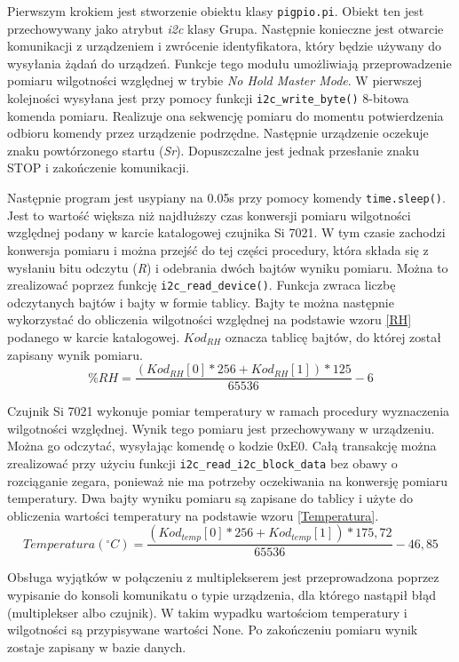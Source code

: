 \documentclass[a4paper,12pt,twoside]{article}
\begin{document}
Pierwszym krokiem jest stworzenie obiektu klasy \texttt{pigpio.pi}. Obiekt ten jest przechowywany jako atrybut \textit{i2c} klasy Grupa. Następnie konieczne jest otwarcie komunikacji z urządzeniem i zwrócenie identyfikatora, który będzie używany do wysyłania żądań do urządzeń. Funkcje tego modułu umożliwiają przeprowadzenie pomiaru wilgotności względnej w trybie \textit{No Hold Master Mode}. W pierwszej kolejności wysyłana jest przy pomocy funkcji \texttt{i2c{\_}write{\_}byte()} 8-bitowa komenda pomiaru. Realizuje ona sekwencję pomiaru do momentu potwierdzenia odbioru komendy przez urządzenie podrzędne. Następnie urządzenie oczekuje znaku powtórzonego startu (\textit{Sr}). Dopuszczalne jest jednak przesłanie znaku STOP i zakończenie komunikacji.

Następnie program jest usypiany na 0.05s przy pomocy komendy \texttt{time.sleep()}. Jest to wartość większa niż najdłuższy czas konwersji pomiaru wilgotności względnej podany w karcie katalogowej czujnika Si 7021. W tym czasie zachodzi konwersja pomiaru i można przejść do tej części procedury, która składa się z wysłaniu bitu odczytu (\textit{R}) i odebrania dwóch bajtów wyniku pomiaru. Można to zrealizować poprzez funkcję \texttt{i2c{\_}read{\_}device()}\cite{i2c_read_device}. Funkcja zwraca liczbę odczytanych bajtów i bajty w formie tablicy. Bajty te można następnie wykorzystać do obliczenia wilgotności względnej na podstawie wzoru \ref{RH} podanego w karcie katalogowej. ${Kod_{RH}}$ oznacza tablicę bajtów, do której został zapisany wynik pomiaru.
\begin{equation} \label{RH}
\%RH = \frac{(Kod_{RH}[0] * 256 + Kod_{RH}[1]) * 125}{65536} - 6  
\end{equation}

Czujnik Si 7021 wykonuje pomiar temperatury w ramach procedury wyznaczenia wilgotności względnej. Wynik tego pomiaru jest przechowywany w urządzeniu. Można go odczytać, wysyłając komendę o kodzie 0xE0. Całą transakcję można zrealizować przy użyciu funkcji \texttt{i2c{\_}read{\_}i2c{\_}block{\_}data} bez obawy o rozciąganie zegara, ponieważ nie ma potrzeby oczekiwania na konwersję pomiaru temperatury. Dwa bajty wyniku pomiaru są zapisane do tablicy i użyte do obliczenia wartości temperatury na podstawie wzoru \ref{Temperatura}.
\begin{equation} \label{Temperatura}
Temperatura ({^\circ}C) = \frac{(Kod_{temp}[0] * 256 + Kod_{temp}[1]) * 175,72}{65536} - 46,85  
\end{equation}

Obsługa wyjątków w połączeniu z multiplekserem jest przeprowadzona poprzez wypisanie do konsoli komunikatu o typie urządzenia, dla którego nastąpił błąd (multiplekser albo czujnik). W takim wypadku wartościom temperatury i wilgotności są przypisywane wartości None. Po zakończeniu pomiaru wynik zostaje zapisany w bazie danych.
\end{document}
